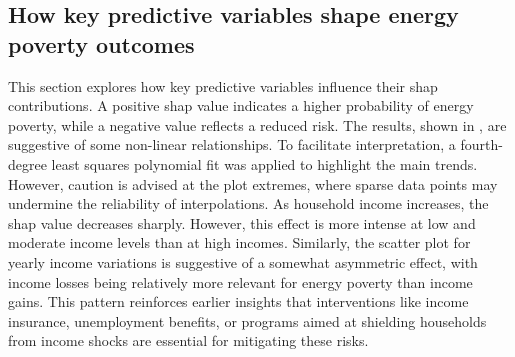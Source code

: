\documentclass[preprint,authoryear,12pt]{elsarticle}
\begin{document}
\subsection{How key predictive variables shape energy poverty outcomes} \label{How_Key_Predictive_Variables_Shape_Energy_Poverty_Outcomes}

This section explores how key predictive variables influence their \Gls{shap} contributions. A positive \Gls{shap} value indicates a higher probability of energy poverty, while a negative value reflects a reduced risk. The results, shown in , are suggestive of some non-linear relationships. To facilitate interpretation, a fourth-degree least squares polynomial fit was applied to highlight the main trends. However, caution is advised at the plot extremes, where sparse data points may undermine the reliability of interpolations. As household income increases, the \Gls{shap} value decreases sharply. However, this effect is more intense at low and moderate income levels than at high incomes. Similarly, the scatter plot for yearly income variations is suggestive of a somewhat asymmetric effect, with income losses being relatively more relevant for energy poverty than income gains. This pattern reinforces earlier insights that interventions like income insurance, unemployment benefits, or programs aimed at shielding households from income shocks are essential for mitigating these risks.
\end{document}
